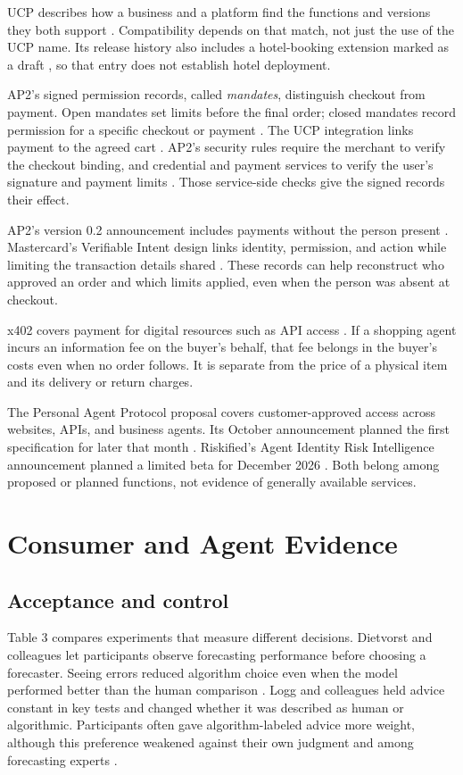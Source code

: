 \documentclass{article}
\begin{document}
UCP describes how a business and a platform find the functions and versions they both support \cite{ref6}. Compatibility depends on that match, not just the use of the UCP name. Its release history also includes a hotel-booking extension marked as a draft \cite{ref5}, so that entry does not establish hotel deployment.

AP2's signed permission records, called \textit{mandates}, distinguish checkout from payment. Open mandates set limits before the final order; closed mandates record permission for a specific checkout or payment \cite{ref8}. The UCP integration links payment to the agreed cart \cite{ref13}. AP2's security rules require the merchant to verify the checkout binding, and credential and payment services to verify the user's signature and payment limits \cite{ref21}. Those service-side checks give the signed records their effect.

AP2's version 0.2 announcement includes payments without the person present \cite{ref7}. Mastercard's Verifiable Intent design links identity, permission, and action while limiting the transaction details shared \cite{ref9}. These records can help reconstruct who approved an order and which limits applied, even when the person was absent at checkout.

x402 covers payment for digital resources such as API access \cite{ref14}. If a shopping agent incurs an information fee on the buyer's behalf, that fee belongs in the buyer's costs even when no order follows. It is separate from the price of a physical item and its delivery or return charges.

The Personal Agent Protocol proposal covers customer-approved access across websites, APIs, and business agents. Its October announcement planned the first specification for later that month \cite{ref10}. Riskified's Agent Identity Risk Intelligence announcement planned a limited beta for December 2026 \cite{ref11}. Both belong among proposed or planned functions, not evidence of generally available services.

\section{Consumer and Agent Evidence}

\subsection{Acceptance and control}

Table 3 compares experiments that measure different decisions. Dietvorst and colleagues let participants observe forecasting performance before choosing a forecaster. Seeing errors reduced algorithm choice even when the model performed better than the human comparison \cite{ref29}. Logg and colleagues held advice constant in key tests and changed whether it was described as human or algorithmic. Participants often gave algorithm-labeled advice more weight, although this preference weakened against their own judgment and among forecasting experts \cite{ref30}.
\end{document}
